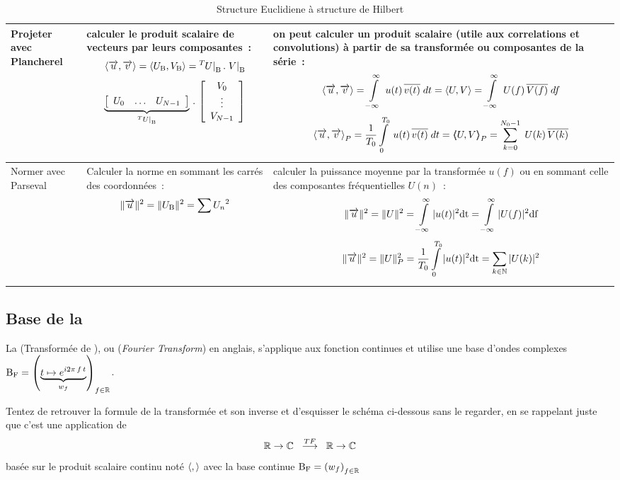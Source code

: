 \begin{table}[htbp]
\begin{tabular}{p{}|p{}|p{}}
  Projeter avec Plancherel  &  calculer le produit scalaire de vecteurs par leurs composantes~: $$\scal{\vec{u}}{\vec{v}}=\scal{U_{\B}}{V_{\B}}=\Tr{\vecDs{U}{\B}}\,.\,\vecDs{V}{\B}$$ $$\caCest{\hhhect{U_0}{\ldots}{U_{N-1}}}{\Tr{\vecDs{U}{\B}}}\,.\,\vvvect{V_0}{\vdots}{V_{N-1}}$$
                   &  on peut calculer un produit scalaire (utile aux correlations et convolutions) à partir de sa transformée ou composantes de la série~: $$\scal{\vec{u}}{\vec{v}}=\scalint{u(t)}{v(t)}{t} = \scal{U}{V} =  \scalint{U(f)}{V(f)}{f}$$ $$\scalp{\vec{u}}{\vec{v}}=\scalpint{u(t)}{v(t)}{t} = \scaldp{U}{V} =  \scalpdint{U(k)}{V(k)}{k}$$
  \\\hline
  
  Normer avec Parseval  &  Calculer la norme en sommant les carrés des coordonnées~: $$\|\vec{u}\|^2=\|U_{\B}\|^2=\sum {U_n}^2$$ &  calculer la puissance moyenne par la transformée $u(f)$ ou en sommant celle des composantes fréquentielles $U(n)$~: $$\|\vec{u}\|^2=\|U\|^2=\int\limits_{-\infty}^{\infty}{|u(t)|^2\dt}=\int\limits_{-\infty}^{\infty}{|U(f)|^2\df} $$  $$\|\vec{u}\|^2=\|U\|_P^2=\frac{1}{T_0}\int\limits_{0}^{T_0}{|u(t)|^2\dt}=\sum\limits_{k\in\N}{|U(k)|^2} $$
\end{tabular}

\caption{Structure Euclidiene à structure de Hilbert}
\label{tab:hilbert}
\end{table}

\subsection{Base de la \TF{}}

La \TF{} (Transformée de \Fourier), ou \FT{} (\emph{Fourier
  Transform}) en anglais, s'applique aux fonction continues et utilise
une base d'ondes complexes
$\Bf=\p{\caCest{t\mapsto e^{i 2 \pi\,f\,t}}{w_f}}_{f\in\R}$.

\begin{exercice}
Tentez de retrouver la formule de la transformée et son inverse et d'esquisser le schéma ci-dessous sans le regarder, en se rappelant juste que c'est une application de $$\R\rightarrow\C\;\;\operateur{\TF}\;\;\R\rightarrow\C$$ basée sur le produit scalaire continu noté $\scal{}{}$ avec la base continue $\Bf=\p{w_f}_{f\in\R}$
\end{exercice}


